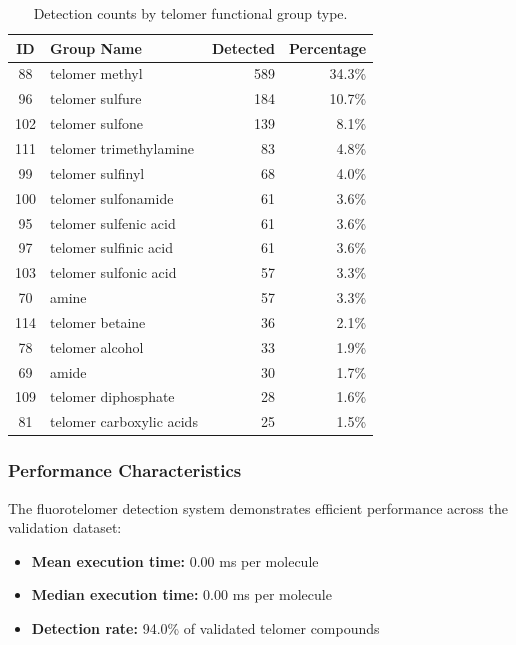 \begin{table}[htbp]
\centering
\caption{Detection counts by telomer functional group type.}
\label{tab:telomer_groups}
\begin{tabular}{clrr}
\toprule
\rowcolor[HTML]{D6E4F5}\textbf{ID} & \textbf{Group Name} & \textbf{Detected} & \textbf{Percentage} \\
\midrule
\rowcolor[HTML]{FAEADE}88 & telomer methyl & 589 & 34.3\% \\
96 & telomer sulfure & 184 & 10.7\% \\
\rowcolor[HTML]{FAEADE}102 & telomer sulfone & 139 & 8.1\% \\
111 & telomer trimethylamine & 83 & 4.8\% \\
\rowcolor[HTML]{FAEADE}99 & telomer sulfinyl & 68 & 4.0\% \\
100 & telomer sulfonamide & 61 & 3.6\% \\
\rowcolor[HTML]{FAEADE}95 & telomer sulfenic acid & 61 & 3.6\% \\
97 & telomer sulfinic acid & 61 & 3.6\% \\
\rowcolor[HTML]{FAEADE}103 & telomer sulfonic acid & 57 & 3.3\% \\
70 & amine & 57 & 3.3\% \\
\rowcolor[HTML]{FAEADE}114 & telomer betaine & 36 & 2.1\% \\
78 & telomer alcohol & 33 & 1.9\% \\
\rowcolor[HTML]{FAEADE}69 & amide & 30 & 1.7\% \\
109 & telomer diphosphate & 28 & 1.6\% \\
\rowcolor[HTML]{FAEADE}81 & telomer carboxylic acids & 25 & 1.5\% \\
\bottomrule
\end{tabular}
\end{table}

\subsubsection*{Performance Characteristics}

The fluorotelomer detection system demonstrates efficient performance across the validation dataset:

\begin{itemize}
\item \textbf{Mean execution time:} 0.00 ms per molecule
\item \textbf{Median execution time:} 0.00 ms per molecule
\item \textbf{Detection rate:} 94.0\% of validated telomer compounds
\end{itemize}


